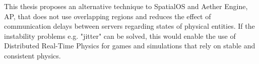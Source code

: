 This thesis proposes an alternative technique to SpatialOS and Aether Engine, AP, that does not use overlapping regions and reduces the effect of communication delays between servers regarding states of physical entities. If the instability problems e.g. "jitter" can be solved, this would enable the use of Distributed Real-Time Physics for games and simulations that rely on stable and consistent physics.








%






